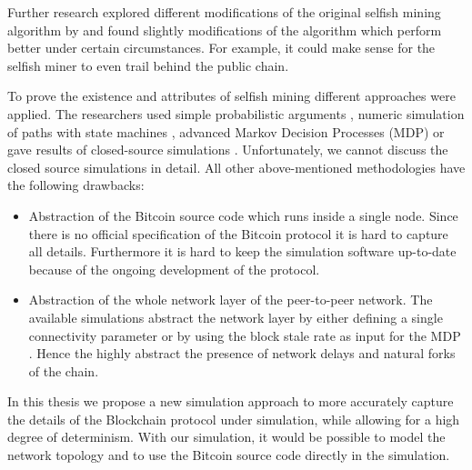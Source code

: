 \documentclass{scrartcl}
\begin{document}
Further research \cite{nayak2016stubborn,sapirshtein2016optimal, gervais2015tampering, gervais2016security, bahack2013theoretical} explored different modifications of the original selfish mining algorithm by \citeauthor{eyal2014majority} and found slightly modifications of the algorithm which perform better under certain circumstances.
For example, it could make sense for the selfish miner to even trail behind the public chain.

To prove the existence and attributes of selfish mining different approaches were applied.
The researchers used simple probabilistic arguments \cite{eyal2014majority, bahack2013theoretical}, numeric simulation of paths with state machines \cite{gervais2015tampering, nayak2016stubborn}, advanced Markov Decision Processes (MDP) \cite{sapirshtein2016optimal, gervais2016security} or gave results of closed-source simulations \cite{eyal2014majority, sapirshtein2016optimal}.
Unfortunately, we cannot discuss the closed source simulations in detail.
All other above-mentioned methodologies have the following drawbacks:
\begin{itemize}
\item Abstraction of the Bitcoin source code which runs inside a single node.
Since there is no official specification of the Bitcoin protocol it is hard to capture all details.
Furthermore it is hard to keep the simulation software up-to-date because of the ongoing development of the protocol.
\item Abstraction of the whole network layer of the peer-to-peer network.
The available simulations abstract the network layer by either defining a single connectivity parameter \cite{eyal2014majority, bahack2013theoretical, nayak2016stubborn, sapirshtein2016optimal, gervais2015tampering} or by using the block stale rate as input for the MDP \cite{gervais2016security}.
Hence the highly abstract the presence of network delays and natural forks of the chain.
\end{itemize}

In this thesis we propose a new simulation approach to more accurately capture the details of the Blockchain protocol under simulation, while allowing for a high degree of determinism.
With our simulation, it would be possible to model the network topology and to use the Bitcoin source code directly in the simulation.
\end{document}
